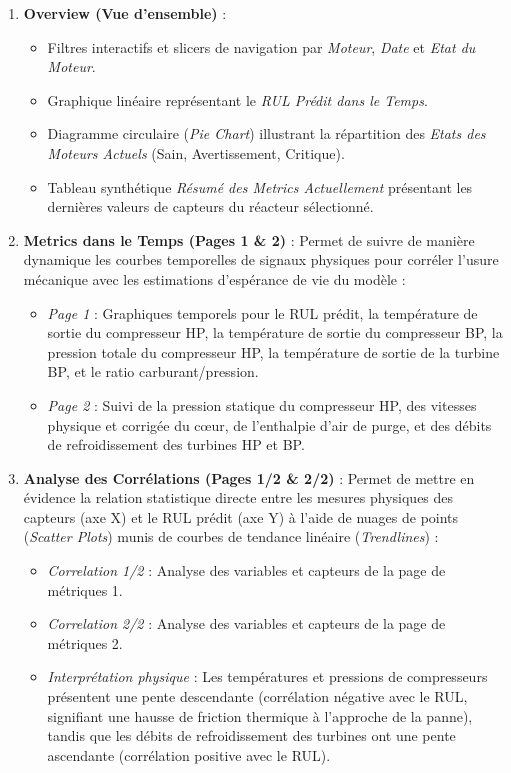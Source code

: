 \documentclass[12pt]{report}
\begin{document}
\begin{enumerate}
    \item \textbf{Overview (Vue d'ensemble)} :
    \begin{itemize}
        \item Filtres interactifs et slicers de navigation par \textit{Moteur}, \textit{Date} et \textit{Etat du Moteur}.
        \item Graphique linéaire représentant le \textit{RUL Prédit dans le Temps}.
        \item Diagramme circulaire (\textit{Pie Chart}) illustrant la répartition des \textit{Etats des Moteurs Actuels} (Sain, Avertissement, Critique).
        \item Tableau synthétique \textit{Résumé des Metrics Actuellement} présentant les dernières valeurs de capteurs du réacteur sélectionné.
    \end{itemize}
    
    \item \textbf{Metrics dans le Temps (Pages 1 \& 2)} :
    Permet de suivre de manière dynamique les courbes temporelles de signaux physiques pour corréler l'usure mécanique avec les estimations d'espérance de vie du modèle :
    \begin{itemize}
        \item \textit{Page 1} : Graphiques temporels pour le RUL prédit, la température de sortie du compresseur HP, la température de sortie du compresseur BP, la pression totale du compresseur HP, la température de sortie de la turbine BP, et le ratio carburant/pression.
        \item \textit{Page 2} : Suivi de la pression statique du compresseur HP, des vitesses physique et corrigée du cœur, de l'enthalpie d'air de purge, et des débits de refroidissement des turbines HP et BP.
    \end{itemize}
    
    \item \textbf{Analyse des Corrélations (Pages 1/2 \& 2/2)} :
    Permet de mettre en évidence la relation statistique directe entre les mesures physiques des capteurs (axe X) et le RUL prédit (axe Y) à l'aide de nuages de points (\textit{Scatter Plots}) munis de courbes de tendance linéaire (\textit{Trendlines}) :
    \begin{itemize}
        \item \textit{Correlation 1/2} : Analyse des variables et capteurs de la page de métriques 1.
        \item \textit{Correlation 2/2} : Analyse des variables et capteurs de la page de métriques 2.
        \item \textit{Interprétation physique} : Les températures et pressions de compresseurs présentent une pente descendante (corrélation négative avec le RUL, signifiant une hausse de friction thermique à l'approche de la panne), tandis que les débits de refroidissement des turbines ont une pente ascendante (corrélation positive avec le RUL).
    \end{itemize}
\end{enumerate}
\end{document}
